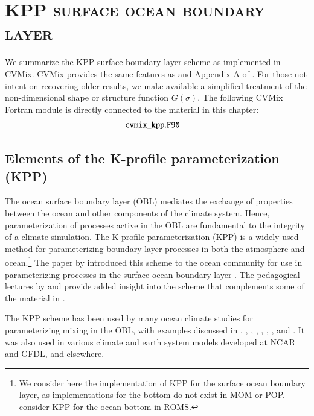 \chapter{\scshape KPP surface ocean boundary layer}
\label{chapter:cvmix_kpp}

\minitoc
\vspace{.5cm}

\begin{mdframed}[backgroundcolor=lightgray!50]
  We summarize the KPP surface boundary layer scheme \citep{LargeKPP}
  as implemented in CVMix.  CVMix provides the same features as
  \cite{LargeKPP} and Appendix A of \cite{Dana_etal2006}.  For those
  not intent on recovering older results, we make available a
  simplified treatment of the non-dimensional shape or structure
  function $G(\sigma)$.  The following CVMix Fortran module is
  directly connected to the material in this chapter:
\begin{align*} 
 & {\tt cvmix\_kpp.F90}
\end{align*}
\end{mdframed}


\section{Elements of the K-profile parameterization (KPP)}
\label{sec:implementation}

The ocean surface boundary layer (OBL) mediates the exchange of
properties between the ocean and other components of the climate
system. Hence, parameterization of processes active in the OBL are
fundamental to the integrity of a climate simulation. The K-profile
parameterization (KPP) is a widely used method for parameterizing
boundary layer processes in both the atmosphere and ocean.\footnote{We
  consider here the implementation of KPP for the surface ocean
  boundary layer, as implementations for the bottom do not exist in
  MOM or POP.  \cite{Durski_etal2004} consider KPP for the ocean
  bottom in ROMS.} The paper by \cite{LargeKPP} introduced this scheme
to the ocean community for use in parameterizing processes in the
surface ocean boundary layer .  The pedagogical lectures by
\cite{LargeKPP_lectures} and \cite{Large2012} provide added insight
into the scheme that complements some of the material in
\cite{LargeKPP}.

The KPP scheme has been used by many ocean climate studies for
parameterizing mixing in the OBL, with examples discussed in
\cite{Largeforcing}, \cite{HollandChowBryan1998},
\cite{Gent_etal_1998}, \cite{GOTM}, \cite{LiChowMcWilliamsFu2001},
\cite{Smyth_etal2002}, \cite{Durski_etal2004}, and
\cite{Chang_etal2005}.  It was also used in various climate and earth
system models developed at NCAR and GFDL, and elsewhere.  

